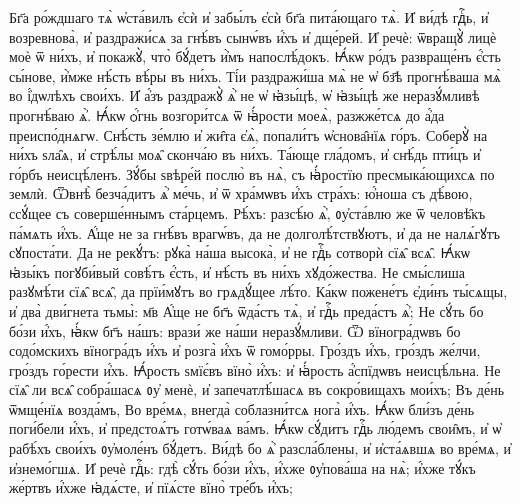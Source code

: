 \hKv  Бг҃а ро́ждшаго тѧ̀  ѡ҆ста́вилъ є҆сѝ и҆ забы́лъ є҆сѝ бг҃а пита́ющаго тѧ̀.  
\hKv И҆ ви́дѣ гдⷭ҇ь, и҆ возревнова̀, и҆ раздражи́сѧ за  гнѣ́въ сынѡ́въ и҆́хъ и҆ дще́рей. 
\hKv И҆ речѐ: ѿвращꙋ̀  лицѐ моѐ ѿ ни́хъ, и҆ покажꙋ̀, что̀ бꙋ́детъ и҆̀мъ  напослѣ́докъ. 
\hKv Ꙗ҆́кѡ ро́дъ развраще́нъ є҆́сть  сы́нове, и҆̀мже нѣ́сть вѣ́ры въ ни́хъ. 
\hKv Ті́и  раздражи́ша мѧ̀ не ѡ҆ бз҃ѣ прогнѣ́ваша мѧ̀ во і҆́дѡлѣхъ  свои́хъ. 
\hKv И҆ а҆́зъ раздражꙋ̀ ѧ҆̀ не ѡ҆ ꙗ҆зы́цѣ, ѡ҆  ꙗ҆зы́цѣ же неразꙋ́мливѣ прогнѣ́ваю ѧ҆̀. 
\hKv Ꙗ҆́кѡ  ѻ҆́гнь возгори́тсѧ ѿ ꙗ҆́рости моеѧ̀, разжже́тсѧ до а҆́да  преиспо́днѧгѡ. 
\hKv Снѣ́сть зе́млю и҆ жи̑та є҆ѧ̀,  попали́тъ ѡ҆снова̑нїѧ го́ръ. 
\hKv Соберꙋ̀ на ни́хъ ѕла̑ѧ,  и҆ стрѣ́лы моѧ̑ сконча́ю въ ни́хъ. 
\hKv Та́юще гла́домъ,  и҆ снѣ́дь пти́цъ и҆ го́рбъ неисцѣ́ленъ. 
\hKv Зꙋ́бы  ѕвѣре́й послю̀ въ нѧ̀,  съ ꙗ҆́ростїю пресмыка́ющихсѧ по  землѝ. 
\hKv Ѿвнѣ̀ безча́дитъ ѧ҆̀ ме́чь, и҆ ѿ  хра́мѡвъ и҆́хъ стра́хъ:  ю҆́ноша  съ дѣ́вою, ссꙋ́щее съ соверше́ннымъ ста́рцемъ. 
\hKv   Рѣ́хъ: разсѣ́ю ѧ҆̀, ᲂу҆ста́влю же ѿ человѣ̑къ па́мѧть  и҆́хъ. 
\hKv А҆́ще не за гнѣ́въ врагѡ́въ, да не  долголѣ́тствꙋютъ, и҆ да не налѧ́гꙋтъ сꙋпоста́ти. 
\hKv Да  не рекꙋ́тъ: рꙋка̀ на́ша высока̀, и҆ не гдⷭ҇ь сотворѝ сїѧ̑  всѧ̑. 
\hKv Ꙗ҆́кѡ ꙗ҆зы́къ погꙋби́вый совѣ́тъ є҆́сть, и҆  нѣ́сть въ ни́хъ хꙋдо́жества. 
\hKv Не смы́слиша разꙋмѣ́ти  сїѧ̑ всѧ̑, да прїи́мꙋтъ во грѧдꙋ́щее лѣ́то. 
\hKv Ка́кѡ  пожене́тъ є҆ди́нъ ты́сѧщы, и҆ два̀ дви́гнета тьмы̀: м҃в  А҆́ще не бг҃ъ ѿда́стъ тѧ̀, и҆ гдⷭ҇ь преда́стъ ѧ҆̀; 
\hKv  Не сꙋ́ть бо бо́зи и҆́хъ, ꙗ҆́кѡ бг҃ъ на́шъ: врази́ же на́ши  неразꙋ́мливи. 
\hKv Ѿ вїногра́дѡвъ бо содо́мскихъ  вїногра́дъ и҆́хъ и҆ розга̀ и҆́хъ ѿ гомо́рры. 
\hKv  Гро́здъ и҆́хъ, гро́здъ же́лчи, гро́здъ го́рести и҆́хъ. 
\hKv  Ꙗ҆́рость ѕмїє́въ вїно̀ и҆́хъ: и҆ ꙗ҆́рость а҆́спїдѡвъ  неисцѣ́льна. 
\hKv Не сїѧ̑ ли всѧ̑ собра́шасѧ ᲂу҆ менѐ,  и҆ запечатлѣ́шасѧ въ сокро́вищахъ мои́хъ; 
\hKv Въ де́нь  ѿмще́нїѧ возда́мъ, 
\hKv Во вре́мѧ, внегда̀ соблазни́тсѧ    нога̀ и҆́хъ. 
\hKv Ꙗ҆́кѡ  бли́зъ де́нь поги́бели и҆́хъ, и҆ предстоѧ́тъ готѡ́ваѧ ва́мъ.  
\hKv Ꙗ҆́кѡ сꙋ́дитъ гдⷭ҇ь лю́демъ свои̑мъ, и҆ ѡ҆ рабѣ́хъ  свои́хъ ᲂу҆моле́нъ бꙋ́детъ. 
\hKv Ви́дѣ бо ѧ҆̀  разсла́блены, и҆ и҆ста́ѧвшѧ во вре́мѧ, и҆ и҆знемо́гшѧ. 
\hKv  И҆ речѐ гдⷭ҇ь: гдѣ̀ сꙋ́ть бо́зи и҆́хъ, и҆́хже ᲂу҆пова́ша  на нѧ̀; и҆́хже тꙋ́къ же́ртвъ и҆́хже ꙗ҆дѧ́сте, и҆ пїѧ́сте  вїно̀ тре́бъ и҆́хъ; 
